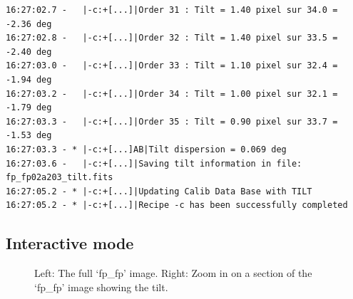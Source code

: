 \begin{lstlisting}[style=text]
16:27:02.7 -   |-c:+[...]|Order 31 : Tilt = 1.40 pixel sur 34.0 = -2.36 deg
16:27:02.8 -   |-c:+[...]|Order 32 : Tilt = 1.40 pixel sur 33.5 = -2.40 deg
16:27:03.0 -   |-c:+[...]|Order 33 : Tilt = 1.10 pixel sur 32.4 = -1.94 deg
16:27:03.2 -   |-c:+[...]|Order 34 : Tilt = 1.00 pixel sur 32.1 = -1.79 deg
16:27:03.3 -   |-c:+[...]|Order 35 : Tilt = 0.90 pixel sur 33.7 = -1.53 deg
16:27:03.3 - * |-c:+[...]AB|Tilt dispersion = 0.069 deg
16:27:03.6 -   |-c:+[...]|Saving tilt information in file: fp_fp02a203_tilt.fits
16:27:05.2 - * |-c:+[...]|Updating Calib Data Base with TILT
16:27:05.2 - * |-c:+[...]|Recipe -c has been successfully completed
\end{lstlisting}

\subsection{Interactive mode}

\begin{figure}
\begin{center}
\caption{Left: The full `fp\_fp' image. Right: Zoom in on a section of the `fp\_fp' image showing the tilt.\label{figure:cal_slit_spirou_1}}
\end{center}
\end{figure}

